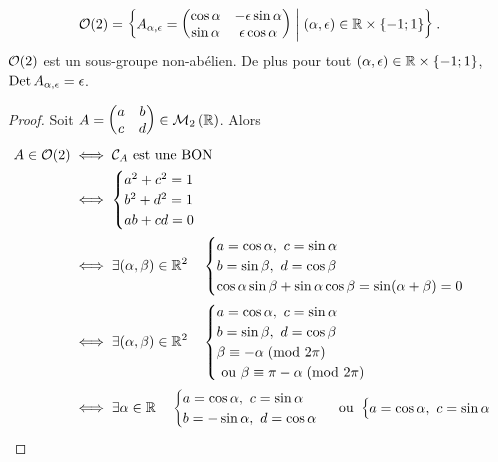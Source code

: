 \begin{theo}
  \begin{equation}
    \mathcal{O}\!\left(2\right) = \left\{A_{\alpha, \epsilon}=\begin{pmatrix} \cos \alpha & 
      -\epsilon\sin\alpha \\ \sin\alpha & 
    \epsilon\cos\alpha\end{pmatrix}\mathrel{}\middle|\mathrel{}(\alpha, \epsilon)\in \mathbb{R}\times\{-1; 
    1\}\right\}.
  \end{equation}
  \(\mathcal{O}\!\left(2\right)\) est un sous-groupe non-abélien. De plus pour tout \((\alpha, 
  \epsilon)\in \mathbb{R}\times\{-1; 1\}\), \(\operatorname{Det} A_{\alpha, \epsilon} = 
  \epsilon\).
\end{theo}
\begin{proof}
  Soit \(A=\begin{pmatrix} a & b \\ c & d \end{pmatrix} \in \mathcal{M}_{2}\left(\mathbb{R}\right)\). 
    Alors
    \begin{align}
      A \in \Orth{2} &\iff \courbe_A \text{~est une BON} \\
      &\iff \begin{cases} a^2+c^2=1 \\ b^2+d^2=1 \\ ab+cd=0 \end{cases}\\
        &\iff \exists (\alpha, \beta) \in \R^2 \quad \begin{cases} 
          a=\cos\alpha, \ c=\sin\alpha \\ b=\sin\beta, \ d=\cos\beta \\ 
          \cos\alpha\sin\beta+\sin\alpha\cos\beta=\sin(\alpha+\beta)=0 
        \end{cases}\\
        &\iff \exists (\alpha, \beta) \in \R^2 \quad \begin{cases} 
          a=\cos\alpha, \ c=\sin\alpha \\ b=\sin\beta, \ d=\cos\beta \\ 
          \congru{\beta}{-\alpha}{2\pi} \\ \text{~ou~} 
        \congru{\beta}{\pi-\alpha}{2\pi} \end{cases}\\
        &\iff \exists \alpha \in \R \quad \begin{cases} a=\cos\alpha, \ 
        c=\sin\alpha \\ b=-\sin\alpha, \ d=\cos\alpha \end{cases} 
        \text{~ou~} \begin{cases} a=\cos\alpha, \ c=\sin\alpha \\ 

\end{cases}
\end{align}
\end{proof}
